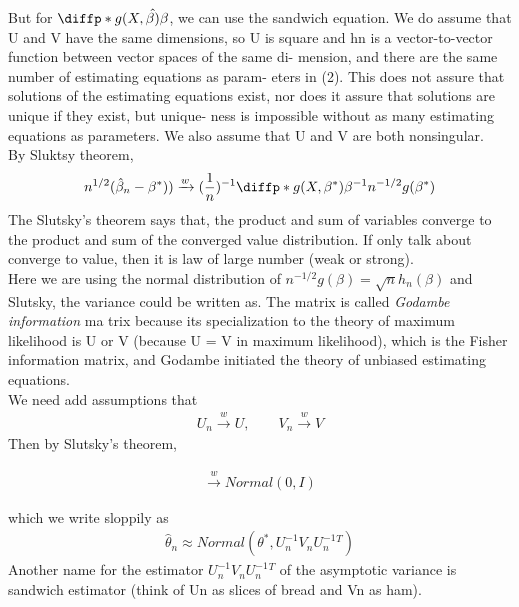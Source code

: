 But for $\diffp*{g(X, \hat{\beta)}}{\beta}{}$, we can use the sandwich equation.
We do assume that U and V have the same dimensions, so U is square
and hn is a vector-to-vector function between vector spaces of the same di-
mension, and there are the same number of estimating equations as param-
eters in (2). This does not assure that solutions of the estimating equations
exist, nor does it assure that solutions are unique if they exist, but unique-
ness is impossible without as many estimating equations as parameters. We
also assume that U and V are both nonsingular.\\

By Sluktsy theorem, 
\begin{align*}
   n^{1/2} (\hat{\beta}_n - \beta^{\ast}) ) \xrightarrow{w} (\frac{1}{n})^{-1} \diffp*{ g(X, \beta^{\ast})}{\beta}{}^{-1} n^{-1/2}g(\beta^{\ast})
\end{align*} 
The Slutsky's theorem says that, the product and sum of variables converge to the product and sum of the converged value distribution. If only talk about converge to value, then it is law of large number (weak or strong).\\
Here we are using the normal distribution of $n^{-1/2} g(\beta) = \sqrt{n} h_n(\beta)$ and Slutsky, the variance could be written as. 
The matrix is called \textit{Godambe information} ma trix because its specialization to the theory of maximum likelihood is U or V (because U = V in maximum likelihood), which is the Fisher information
matrix, and Godambe initiated the theory of unbiased estimating equations. \\

We need add assumptions that 
\begin{align*}
  U_n \xrightarrow{w} U, \qquad V_n \xrightarrow{w} V
\end{align*} 
Then by Slutsky's theorem, 

\begin{align*}
  [U_n^{-1} V_n U_n^{-1}^T] [n^{1/2} (\hat{\theta}_n - \theta^{\ast})] \xrightarrow{w} Normal (0,I)
\end{align*} 

which we write sloppily as
\begin{align*}
  \hat{\theta}_n \approx Normal (\theta^{\ast}, U_n^{-1} V_n U_n^{-1}^T)
\end{align*} 
Another name for the estimator $U_n^{-1} V_n U_n^{-1}^T$  of the asymptotic variance is sandwich estimator (think of Un as slices of bread and Vn as ham).\\

